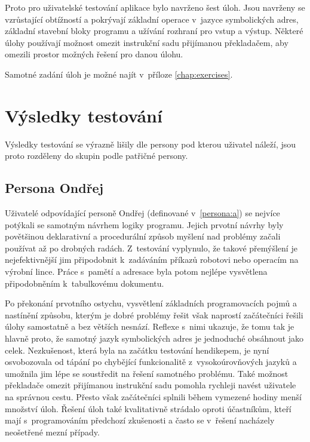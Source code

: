 Proto pro uživatelské testování aplikace bylo navrženo šest úloh. Jsou navrženy se vzrůstající obtížností a pokrývají základní operace v~jazyce symbolických adres, základní stavební bloky programu a užívání rozhraní pro vstup a výstup. Některé úlohy používají možnost omezit instrukční sadu přijímanou překladačem, aby omezili prostor možných řešení pro danou úlohu.

Samotné zadání úloh je možné najít v~příloze \ref{chap:exercises}.

\section{Výsledky testování}

Výsledky testování se výrazně lišily dle persony pod kterou uživatel náleží, jsou proto rozděleny do skupin podle patřičné persony.

\subsection{Persona Ondřej}

Uživatelé odpovídající personě Ondřej (definované v~\ref{persona:a}) se nejvíce potýkali se samotným návrhem logiky programu. Jejich prvotní návrhy byly povětšinou deklarativní a procedurální způsob myšlení nad problémy začali používat až po drobných radách. Z~testování vyplynulo, že takové přemýšlení je nejefektivnější jim připodobnit k~zadáváním příkazů robotovi nebo operacím na výrobní lince. Práce s~pamětí a adresace byla potom nejlépe vysvětlena připodobněním k~tabulkovému dokumentu.

Po překonání prvotního ostychu, vysvětlení základních programovacích pojmů a nastínění způsobu, kterým je dobré problémy řešit však naprostí začátečníci řešili úlohy samostatně a bez větších nesnází. Reflexe s~nimi ukazuje, že tomu tak je hlavně proto, že samotný jazyk symbolických adres je jednoduché obsáhnout jako celek. Nezkušenost, která byla na začátku testování hendikepem, je nyní osvobozovala od tápání po chybějící funkcionalitě z~vysokoúrovňových jazyků a umožnila jim lépe se soustředit na řešení samotného problému. Také možnost překladače omezit přijímanou instrukční sadu pomohla rychleji navést uživatele na správnou cestu. Přesto však začátečníci splnili během vymezené hodiny menší množství úloh. Řešení úloh také kvalitativně strádalo oproti účastníkům, kteří mají s~programováním předchozí zkušenosti a často se v~řešení nacházely neošetřené mezní případy.

